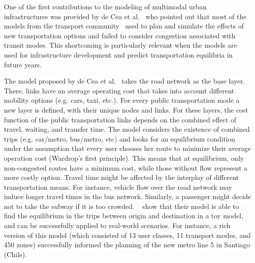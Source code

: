 One of the first contributions to the modeling of multimodal urban infrastructures was provided by de Cea et al.~\cite{decea2005equilibrium} who pointed out that most of the models from the transport community~\cite{boyce1994introducing,boyce2002sequential,decea2007transit} used to plan and simulate the effects of new transportation options and failed to consider congestion associated with transit modes. This shortcoming is particularly relevant when the models are used for infrastructure development and predict transportation equilibria in future years. 

The model proposed by de Cea et al.~\cite{decea2005equilibrium} takes the road network as the base layer. There, links have an average operating cost that takes into account different mobility options (e.g. cars, taxi, etc.). For every public transportation mode a new layer is defined, with their unique nodes and links. For these layers, the cost function of the public transportation links depends on the combined effect of travel, waiting, and transfer time. The model considers the existence of combined trips (e.g. car/metro, bus/metro, etc) and looks for an equilibrium condition under the assumption that every user chooses her route to minimize their average operation cost (Wardrop’s first principle). This means that at equilibrium, only non-congested routes have a minimum cost, while those without flow represent a more costly option. Travel time might be affected by the interplay of different transportation means. For instance, vehicle flow over the road network may induce longer travel times in the bus network. Similarly, a passenger might decide not to take the subway if it is too crowded. ~\cite{decea2005equilibrium} show that their model is able to find the equilibrium in the trips between origin and destination in a toy model, and can be successfully applied to real-world scenarios. For instance, a rich version of this model (which consisted of 13 user classes, 11 transport modes, and 450 zones) successfully informed the planning of the new metro line 5 in Santiago (Chile).


